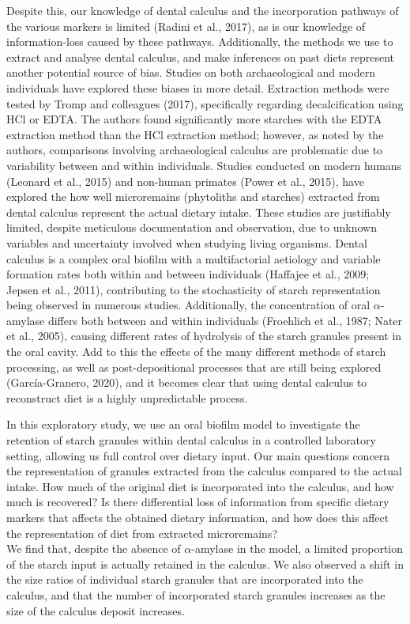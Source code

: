 \documentclass[
]{article}
\begin{document}
Despite this, our knowledge of dental calculus and the incorporation pathways of
the various markers is limited (Radini et al., 2017), as is our
knowledge of information-loss caused by these pathways. Additionally, the methods
we use to extract and analyse dental calculus, and make inferences on past diets
represent another potential source of bias. Studies on both archaeological and
modern individuals have explored these biases in more detail.
Extraction methods were tested
by Tromp and colleagues (2017), specifically regarding
decalcification using HCl or EDTA.
The authors found significantly more starches with the EDTA extraction method
than the HCl extraction method; however, as noted by the authors, comparisons
involving archaeological calculus are problematic due to variability between and
within individuals.
Studies conducted on modern humans (Leonard et al., 2015)
and non-human primates (Power et al., 2015),
have explored the how well microremains (phytoliths and starches)
extracted from dental calculus represent the actual dietary intake.
These studies are justifiably limited,
despite meticulous documentation and observation, due to unknown variables and
uncertainty involved when studying living organisms. Dental calculus is a complex
oral biofilm with a multifactorial aetiology and variable formation rates both
within and between individuals (Haffajee et al., 2009; Jepsen et al., 2011), contributing to
the stochasticity of starch representation being observed in numerous studies.
Additionally, the concentration of oral \(\alpha\)-amylase differs both between and
within individuals (Froehlich et al., 1987; Nater et al., 2005),
causing different rates of hydrolysis of the starch granules present in the oral
cavity. Add to this the effects of the many different methods
of starch processing, as well as post-depositional processes that are still being
explored (García-Granero, 2020), and it becomes clear that using
dental calculus to reconstruct diet is a highly unpredictable process.

In this exploratory study, we use an oral biofilm model to investigate the
retention of starch granules within dental calculus in a controlled laboratory
setting, allowing us full control over dietary input. Our main questions concern
the representation of granules extracted
from the calculus compared to the actual intake. How much of the original diet is
incorporated into the calculus, and how much is recovered?
Is there differential loss of information from specific dietary markers that affects
the obtained dietary information, and how does this affect the representation of
diet from extracted microremains?\\
We find that, despite the absence of \(\alpha\)-amylase in
the model, a limited proportion of the starch input is actually
retained in the calculus. We also observed a shift in the size ratios of individual
starch granules that are incorporated into the calculus, and that the number of
incorporated starch granules increases as the size of the calculus deposit
increases.
\end{document}
